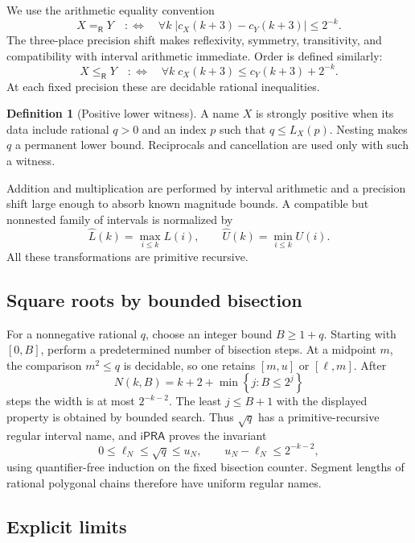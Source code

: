 \documentclass[11pt]{article}
\theoremstyle{definition}
\newtheorem{definition}[theorem]{Definition}
\newcommand{\ipra}{\mathsf{iPRA}}
\newcommand{\Eq}{\mathrel{=_{\!\mathsf R}}}
\newcommand{\Le}{\mathrel{\le_{\!\mathsf R}}}
\newcommand{\abs}[1]{\left|#1\right|}
\newcommand{\set}[1]{\left\{#1\right\}}
\begin{document}
We use the arithmetic equality convention
\begin{equation}
 X\Eq Y
 \quad:\Longleftrightarrow\quad
 \forall k\;\abs{c_X(k+3)-c_Y(k+3)}\leq2^{-k}.
 \label{eq:real-eq}
\end{equation}
The three-place precision shift makes reflexivity, symmetry, transitivity, and
compatibility with interval arithmetic immediate.  Order is defined similarly:
\begin{equation}
 X\Le Y
 \quad:\Longleftrightarrow\quad
 \forall k\;c_X(k+3)\leq c_Y(k+3)+2^{-k}.
 \label{eq:real-le}
\end{equation}
At each fixed precision these are decidable rational inequalities.

\begin{definition}[Positive lower witness]
A name \(X\) is strongly positive when its data include rational
\(q>0\) and an index \(p\) such that \(q\leq L_X(p)\).  Nesting makes \(q\) a
permanent lower bound.  Reciprocals and cancellation are used only with such a
witness.
\end{definition}

Addition and multiplication are performed by interval arithmetic and a
precision shift large enough to absorb known magnitude bounds.  A compatible
but nonnested family of intervals is normalized by
\[
 \widehat L(k)=\max_{i\leq k}L(i),
 \qquad
 \widehat U(k)=\min_{i\leq k}U(i).
\]
All these transformations are primitive recursive.

\subsection{Square roots by bounded bisection}

For a nonnegative rational \(q\), choose an integer bound \(B\geq1+q\).
Starting with \([0,B]\), perform a predetermined number of bisection steps.
At a midpoint \(m\), the comparison \(m^2\leq q\) is decidable, so one retains
\([m,u]\) or \([\ell,m]\).  After
\[
 N(k,B)=k+2+\min\set{j:B\leq2^j}
\]
steps the width is at most \(2^{-k-2}\).  The least \(j\leq B+1\) with the
displayed property is obtained by bounded search.  Thus \(\sqrt q\) has a
primitive-recursive regular interval name, and \(\ipra\) proves the invariant
\[
 0\leq\ell_N\leq\sqrt q\leq u_N,
 \qquad
 u_N-\ell_N\leq2^{-k-2},
\]
using quantifier-free induction on the fixed bisection counter.  Segment
lengths of rational polygonal chains therefore have uniform regular names.

\subsection{Explicit limits}
\end{document}
